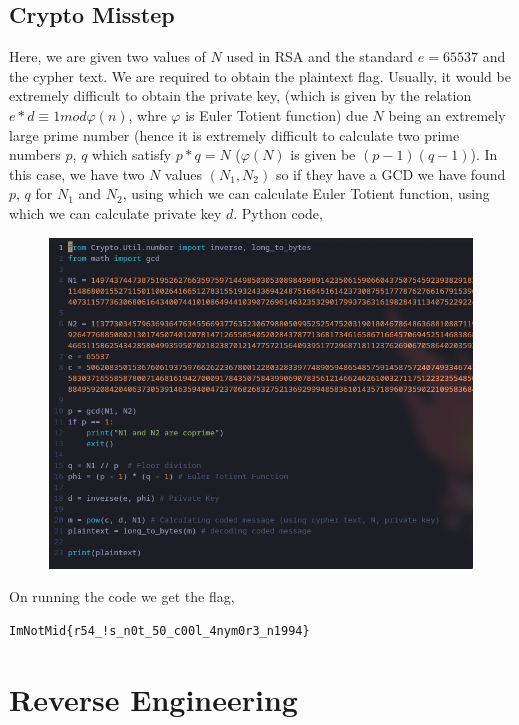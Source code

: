 \documentclass{article}
\begin{document}
\subsection{Crypto Misstep}
Here, we are given two values of $N$ used in RSA and the standard $e = 65537$ and the cypher text. We are required to obtain the plaintext flag. Usually, it would be extremely difficult to obtain the private key, (which is given by the relation $ e*d\equiv 1 mod\varphi(n)$, whre $\varphi$ is Euler Totient function) due $N$ being an extremely large prime number (hence it is extremely difficult to calculate two prime numbers $p$, $q$ which satisfy $p\ast q = N$ ($\varphi(N)$ is given be $(p-1)(q-1)$). \newline \newline
In this case, we have two $N$ values $(N_1, N_2)$ so if they have a GCD we have found $p$, $q$ for $N_1$ and $N_2$, using which we can calculate Euler Totient function, using which we can calculate private key $d$. \newline \newline 
Python code,
\begin{figure}[h!]
    \centering
    \includegraphics[width=1\linewidth]{figs/rsa.png}
    \label{fig:enter-label}
\end{figure}
\pagebreak
\newline On running the code we get the flag, 
\begin{verbatim}
ImNotMid{r54_!s_n0t_50_c00l_4nym0r3_n1994}
\end{verbatim}
\section{Reverse Engineering}
\end{document}
